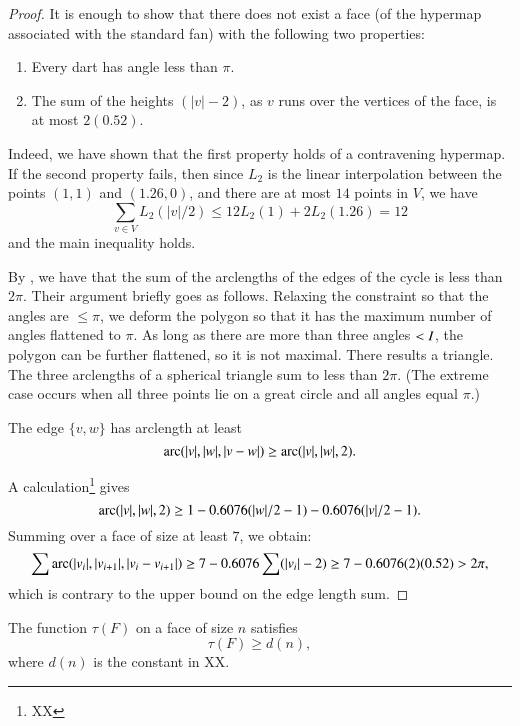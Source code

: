\begin{proof} It is enough to show that there does not exist a face (of the hypermap associated with the standard fan)
with the following two properties:
\begin{enumerate}
\item Every dart has angle less than $\pi$.
\item The sum of the heights $(|v|-2)$, as $v$ runs
over the vertices of the face, is at most $2(0.52)$.
\end{enumerate}
Indeed, we have shown that the first property holds
of a contravening hypermap.  If the second property fails,
then since $L_2$ is the linear interpolation between
the points $(1,1)$ and $(1.26,0)$, and there are at most
$14$ points in $V$, we have
$$\sum_{v\in V}L_2(|v|/2) \le 12 L_2(1) + 2 L_2(1.26) =12$$
and the main inequality holds.

By \cite{vanderWaerden:1951}, we have that the sum of
the arclengths of the edges of the cycle is less than
$2\pi$.  Their argument briefly goes as follows. Relaxing the constraint so that the angles are $\le \pi$, we deform the polygon so that it has the maximum number of angles flattened to $\pi$.  As long as there are more than three angles $<I$, the polygon can be further flattened, so it is not maximal.  There results a triangle.  The three arclengths of a spherical triangle sum to less than $2\pi$.  (The extreme case occurs when all three points lie on a great circle and all angles equal $\pi$.)

The edge $\{v,w\}$ has arclength at least
$$
\operatorname{arc}(|v|,|w|,|v-w|) \ge \operatorname{arc}(|v|,|w|,2). 
$$

A calculation\footnote{XX} gives
$$
\operatorname{arc}(|v|,|w|,2)\ge 1 - 0.6076 (|w|/2 - 1) - 0.6076 (|v|/2 - 1).
$$
Summing over a face of size at least $7$, we obtain:
$$
\sum \operatorname{arc}(|v_i|,|v_{i+1}|,|v_i-v_{i+1}|)\ge
7 - 0.6076 \sum (|v_i|-2) \ge 7 - 0.6076 (2) (0.52) > 2\pi,
$$
which is contrary to the upper bound on the edge length
sum.
\end{proof}

\begin{lemma}  The function $\tau(F)$ on a face of
size $n$ satisfies 
$$
\tau(F) \ge d(n),
$$
where $d(n)$ is the constant in XX.
\end{lemma}

